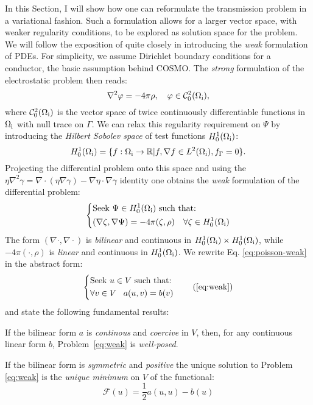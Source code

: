 In this Section, I will show how one can reformulate the transmission problem
in a variational fashion.
Such a formulation allows for a larger vector space, with weaker regularity
conditions, to be explored as solution space for the problem.
We will follow the exposition of \citeauthor{Ern2004-oo} quite closely
in introducing the \emph{weak} formulation of \glspl{PDE}.
For simplicity, we assume Dirichlet boundary conditions for a conductor,
\ie the basic assumption behind \acrshort{COSMO}.
The \emph{strong} formulation of the electrostatic problem then reads:
\begin{equation}\label{eq:poisson-cosmo}
  \nabla^2\varphi = -4\pi\rho,
  \quad \varphi \in \mathcal{C}^2_0(\Omega_\mathrm{i}),
\end{equation}
where $\mathcal{C}^2_0(\Omega_\mathrm{i})$ is the vector space of twice
continuously differentiable functions in $\Omega_\mathrm{i}$ with null trace on
$\Gamma$.
We can relax this regularity requirement on $\Psi$ by introducing the
\emph{Hilbert Sobolev space} of test functions $H_0^1(\Omega_\mathrm{i})$:
\begin{equation}
  H_0^1(\Omega_\mathrm{i}) = \lbrace
  f : \Omega_\mathrm{i} \rightarrow \mathbb{R}
  | f, \nabla f \in L^2(\Omega_\mathrm{i}), f_\Gamma = 0
  \rbrace.
\end{equation}
Projecting the differential problem onto this space and using the
$\eta\nabla^2\gamma = \nabla\cdot(\eta\nabla\gamma) - \nabla\eta\cdot\nabla\gamma$ identity
one obtains the \emph{weak} formulation of the differential problem:
\begin{equation}\label{eq:poisson-weak}
  \left\{
  \begin{aligned}
    &\text{Seek $\Psi \in H_0^1(\Omega_\mathrm{i})$ such that:}\\
    &(\nabla\zeta, \nabla\Psi) =
    -4\pi(\zeta, \rho) \quad
    \forall \zeta\in H_0^1(\Omega_\mathrm{i})
  \end{aligned}
  \right.
\end{equation}
The form $(\nabla\cdot, \nabla\cdot)$ is \emph{bilinear} and continuous
in $H_0^1(\Omega_\mathrm{i})\times H_0^1(\Omega_\mathrm{i})$, while $-4\pi(\cdot, \rho)$ is
\emph{linear} and continuous in $H_0^1(\Omega_\mathrm{i})$.
We rewrite Eq. \eqref{eq:poisson-weak} in the abstract form:
\begin{equation}
  \left\{
  \begin{aligned}
    &\text{Seek $u \in V$ such that:}\\
    &\forall v \in V \,\,\,\,\,
    a(u, v) = b(v)
  \end{aligned}
  \right.
  \tag{\ref{eq:weak}}
\end{equation}
and state the following fundamental results:
\begin{lemma}
  If the bilinear form $a$ is \emph{continous} and \emph{coercive}
  in $V$, then, for any continuous linear form $b$, Problem~\eqref{eq:weak} is
  \emph{well-posed}.
\end{lemma}
\begin{corollary}
  If the bilinear form is \emph{symmetric} and \emph{positive}
  the unique solution to Problem \eqref{eq:weak} is
  the \emph{unique minimum} on $V$ of the functional:
  \[
  \mathcal{F}(u) = \frac{1}{2}a(u, u) - b(u)
  \]
\end{corollary}

